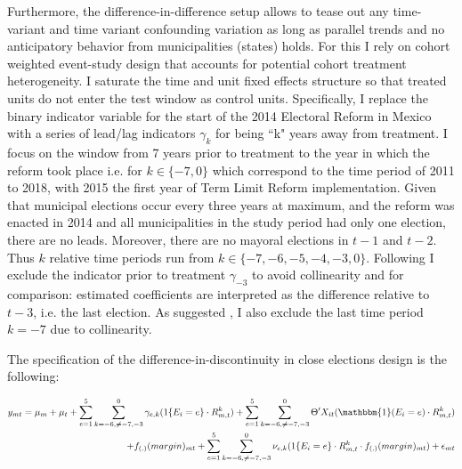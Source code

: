 \documentclass[12pt]{amsart}
\numberwithin{equation}{section}
\theoremstyle{definition}
\theoremstyle{definition}
\theoremstyle{definition}
\begin{document}
Furthermore, the difference-in-difference setup allows to tease out any time-variant and time variant confounding variation as long as parallel trends and no anticipatory behavior from municipalities (states) holds. For this I rely on \citet{abraham_sun_2020} cohort weighted event-study design that accounts for potential cohort treatment heterogeneity. I saturate the time and unit fixed effects structure so that treated units do not enter the test window as control units. Specifically, I replace the binary indicator variable for the start of the 2014 Electoral Reform in Mexico with a series of lead/lag indicators $\gamma_k$ for being ``k" years away from treatment. I focus on the window from 7 years prior to treatment to the year in which the reform took place i.e. for $k \in \{-7,0\} $ which correspond to the time period of 2011 to 2018, with 2015 the first year of Term Limit Reform implementation. Given that municipal elections occur every three years at maximum, and the reform was enacted in 2014 and all municipalities in the study period had only one election, there are no leads. Moreover, there are no mayoral elections in $t-1$ and $t-2$. Thus $k$ relative time periods run from  $k \in\{-7,-6,-5,-4,-3,0\}$. Following \citet{abraham_sun_2020} I exclude the indicator prior to treatment  $\gamma_{-3}$ to avoid collinearity and for comparison: estimated coefficients are interpreted as the difference relative to $t-3$, i.e. the last election. As suggested   \citet{abraham_sun_2020}, I also exclude the last time period $k=-7$ due to collinearity.

The specification of the difference-in-discontinuity in close elections design is the following:

\begin{equation}
\begin{split}
\label{eq:abraham}
y_{mt}=\mu_m + \mu_t + \sum^5_{e=1} \sum^0_{k=-6, \neq {-7,-3}} \gamma_{e,k}(1\{E_i=e\} \cdot R^k_{m,t}) + \sum^5_{e=1} \sum^0_{k=-6, \neq {-7,-3}}  \Theta'X_{it} (\mathbbm{1}(E_i=e)\cdot R^k_{m,t})  \\
+ f_{(.)}(margin)_{mt} + \sum^5_{e=1} \sum^0_{k=-6, \neq {-7,-3}} \nu_{e,k}(1\{E_i=e\} \cdot R^k_{m,t} \cdot  f_{(.)}(margin)_{mt} )+ \epsilon_{mt}
\end{split}
\end{equation}   
  
\end{document}
